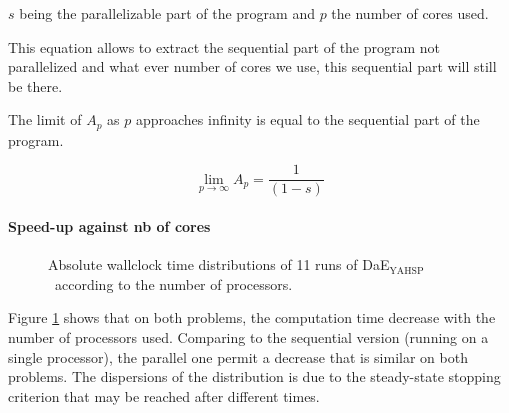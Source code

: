 \documentclass{sig-alternate}
\newcommand{\DAEYAHSP}{{\sc DaE$_{\text{YAHSP}}$}}
\begin{document}
$s$ being the parallelizable part of the program and $p$ the number of cores used.

This equation allows to extract the sequential part of the program not parallelized and what ever number of cores we use, this sequential part will still be there.

The limit of $A_p$ as $p$ approaches infinity is equal to the sequential part of the program.

$$\lim_{p \to \infty} A_p = \frac{1}{(1-s)}$$

\paragraph{Speed-up against nb of cores} %

\begin{figure}[htpb]
  \begin{center}
    \hfill
  \end{center}
  \caption{Absolute wallclock time distributions of 11 runs of \DAEYAHSP\ according to the number of processors.}
  \label{fig:proc_elevators_vs_openstacks}
\end{figure}

Figure \ref{fig:proc_elevators_vs_openstacks} shows that on both problems, the
computation time decrease with the number of processors used. Comparing to the
sequential version (running on a single processor), the parallel one permit a
decrease that is similar on both problems. The dispersions of the distribution 
is due to the steady-state stopping criterion that may be reached after different
times.
\end{document}
